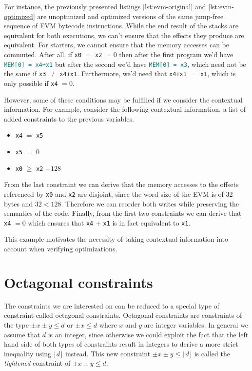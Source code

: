 For instance, the previously presented listings \ref{lst:evm-original} and \ref{lst:evm-optimized}
are unoptimized and optimized versions of the same jump-free sequence of EVM bytecode 
instructions. While the end result of the stacks are equivalent for both executions, we can't
ensure that the effects they produce are equivalent. For starters, we cannot ensure that the 
memory accesses can be commuted. After all, if \verb|x0| $=$ \verb|x2| $= 0$ then after the 
first program we'd have {\textcolor{teal}{\texttt{MEM[0]~=~x4+x1}}} but after the second we'd have 
{\textcolor{teal}{\texttt{MEM[0]~=~x3}}}, which need not be the same if \verb|x3| $\ne$ \verb|x4+x1|.
Furthermore, we'd need that \verb|x4+x1| $=$ \verb|x1|, which is only possible if \verb|x4| $= 0$.

However, some of these conditions may be fulfilled if we consider the contextual information.
For example, consider the following contextual information, a list of added constraints to the
previous variables.

\begin{itemize}
    \item \verb|x4| $=$ \verb|x5|
    \item \verb|x5| $=$ 0
    \item \verb|x0| $\ge$ \verb|x2| $+ 128$
\end{itemize}

From the last constraint we can derive that the memory accesses to the offsets
referenced by \verb|x0| and \verb|x2| are disjoint, since the word size of the EVM is of 32 bytes and 
$32 < 128$. Therefore we can reorder both writes while preserving the semantics of the code.
Finally, from the first two constraints we can derive that \verb|x4| $= 0$ which ensures that \verb|x4| $+$ 
\verb|x1| is in fact equivalent to \verb|x1|.

This example motivates the necessity of taking contextual information into account when verifying
optimizations.

\section{Octagonal constraints}
The constraints we are interested on can be reduced to a special type of constraint called
octagonal constraints. Octagonal constraints are constraints of the type ${\pm x \pm y \le d}$ 
or $\pm x \le d$ where $x$ and $y$ are integer variables. In general we assume that $d$ is an
integer, since otherwise we could exploit the fact that the left hand side of both types of
constraints result in integers to derive a more strict inequality using $\lfloor d \rfloor$
instead. This new constraint $\pm x \pm y \le \lfloor d \rfloor$ is called the \emph{tightened}
constraint of $\pm x \pm y \le d$.

